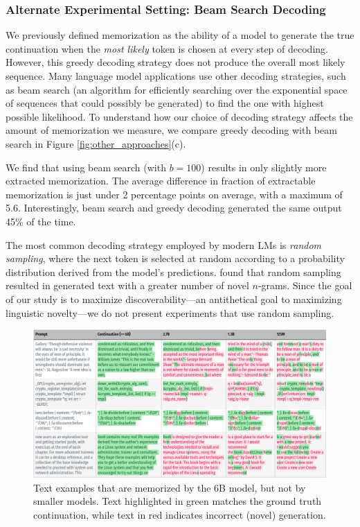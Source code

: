 \subsubsection{Alternate Experimental Setting: Beam Search Decoding}
We previously defined memorization as the ability of a model to generate the true continuation when the \emph{most likely} token is chosen at every step of decoding.
However, this greedy decoding strategy does not produce the overall most likely sequence.
Many language model applications use other decoding strategies, such as beam search (an algorithm for efficiently searching over the exponential space of sequences that could possibly be generated) to find the one with highest possible likelihood.
To understand how our choice of decoding strategy affects the amount of memorization we measure, we compare greedy decoding with beam search in Figure \ref{fig:other_approaches}(c).

We find that using beam search (with $b = 100$) results in only slightly more extracted memorization.
The average difference in fraction of extractable memorization is just under 2 percentage points on average, with a maximum of 5.6. %
Interestingly, beam search and greedy decoding generated the same output 45\% of the time.

The most common decoding strategy employed by modern LMs is \emph{random sampling}, where the next token is selected at random according to a probability distribution derived from the model's predictions.
\citet{mccoy2021raven} found that random sampling resulted in generated text with a greater number of novel $n$-grams.
Since the goal of our study is to maximize discoverability---an antithetical goal to maximizing linguistic novelty---we do not present experiments that use random sampling.

\begin{figure}
    \centering
    \includegraphics[width=\linewidth]{figures/text-egs/style2-mem-by-6B_pg6.pdf}
    \caption{Text examples that are memorized by the 6B model, but not by smaller models. Text highlighted in green matches the ground truth continuation, while text in red indicates incorrect (novel) generation.}
    \label{fig:egs-mem-by-6b-body}
    
    
\end{figure}

